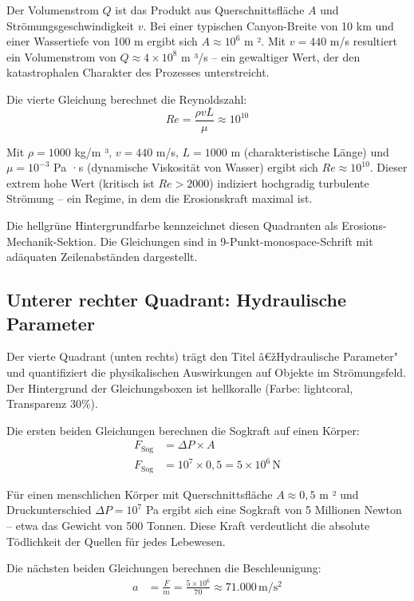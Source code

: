 ﻿\documentclass[12pt,a4paper]{report}
\begin{document}
Der Volumenstrom $Q$ ist das Produkt aus Querschnittsfläche $A$ und Strömungsgeschwin\-digkeit $v$. Bei einer typischen Canyon-Breite von 10 km und einer Wassertiefe von 100 m ergibt sich $A \approx 10^6$ m ². Mit $v = 440$ m/s resultiert ein Volumenstrom von $Q \approx 4 \times 10^8$ m ³/s -- ein gewaltiger Wert, der den katastrophalen Charakter des Prozesses unterstreicht.

Die vierte Gleichung berechnet die Reynoldszahl:
\begin{equation*}
	Re = \frac{\rho v L}{\mu} \approx 10^{10}
\end{equation*}

Mit $\rho = 1000$ kg/m ³, $v = 440$ m/s, $L = 1000$ m (charakteristische Länge) und $\mu = 10^{-3}$ Pa ·s (dynamische Viskosität von Wasser) ergibt sich $Re \approx 10^{10}$. Dieser extrem hohe Wert (kritisch ist $Re > 2000$) indiziert hochgradig turbulente Strömung -- ein Regime, in dem die Erosionskraft maximal ist.

Die hellgrüne Hintergrundfarbe kennzeichnet diesen Quadranten als Erosions-Mechanik-Sektion. Die Gleichungen sind in 9-Punkt-monospace-Schrift mit adäquaten Zeilenabstän\-den dargestellt.

\subsection{Unterer rechter Quadrant: Hydraulische Parameter}

Der vierte Quadrant (unten rechts) trägt den Titel â€žHydraulische Parameter" und quantifiziert die physikalischen Auswirkungen auf Objekte im Strömungsfeld. Der Hintergrund der Gleichungsboxen ist hellkoralle (Farbe: lightcoral, Transparenz 30\%).

Die ersten beiden Gleichungen berechnen die Sogkraft auf einen Körper:
\begin{align*}
	F_{\mathrm{Sog}} &= \Delta P \times A \\
	F_{\mathrm{Sog}} &= 10^7 \times 0{,}5 = 5 \times 10^6 \, \mathrm{N}
\end{align*}

Für einen menschlichen Körper mit Querschnittsfläche $A \approx 0{,}5$ m ² und Druckunterschied $\Delta P = 10^7$ Pa ergibt sich eine Sogkraft von 5 Millionen Newton -- etwa das Gewicht von 500 Tonnen. Diese Kraft verdeutlicht die absolute Tödlichkeit der Quellen für jedes Lebewesen.

Die nächsten beiden Gleichungen berechnen die Beschleunigung:
\begin{align*}
	a &= \frac{F}{m} = \frac{5 \times 10^6}{70} \approx 71{.}000 \, \mathrm{m/s^2}
\end{align*}
\end{document}
